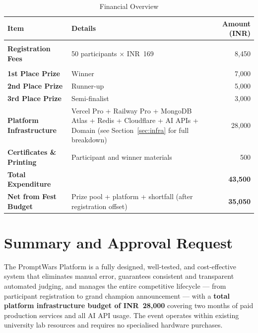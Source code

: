 \documentclass[11pt, a4paper]{article}
\begin{document}
\begin{table}[H]
\centering
\renewcommand{\arraystretch}{1.3}
\begin{tabularx}{\textwidth}{>{\bfseries}l X r}
\toprule
Item & Details & Amount (INR) \\
\midrule
\multicolumn{2}{l}{\textcolor{successgreen}{\textbf{Revenue}}} \\
Registration Fees  & 50 participants $\times$ INR~169 & 8,450 \\
\midrule
\multicolumn{2}{l}{\textcolor{alertred}{\textbf{Expenditure}}} \\
1st Place Prize    & Winner                                    & 7,000 \\
2nd Place Prize    & Runner-up                                 & 5,000 \\
3rd Place Prize    & Semi-finalist                             & 3,000 \\
Platform Infrastructure & Vercel Pro + Railway Pro + MongoDB Atlas + Redis + Cloudflare + AI APIs + Domain (see Section~\ref{sec:infra} for full breakdown) & 28,000 \\
Certificates \& Printing & Participant and winner materials    & 500 \\
\midrule
\textbf{Total Expenditure} & & \textbf{43,500} \\
\textbf{Net from Fest Budget} & Prize pool + platform + shortfall (after registration offset) & \textbf{35,050} \\
\bottomrule
\end{tabularx}
\caption{Financial Overview}
\end{table}

\section{Summary and Approval Request}

The PromptWars Platform is a fully designed, well-tested, and cost-effective system that eliminates manual error, guarantees consistent and transparent automated judging, and manages the entire competitive lifecycle --- from participant registration to grand champion announcement --- with a \textbf{total platform infrastructure budget of INR~28,000} covering two months of paid production services and all AI API usage. The event operates within existing university lab resources and requires no specialised hardware purchases.
\end{document}
